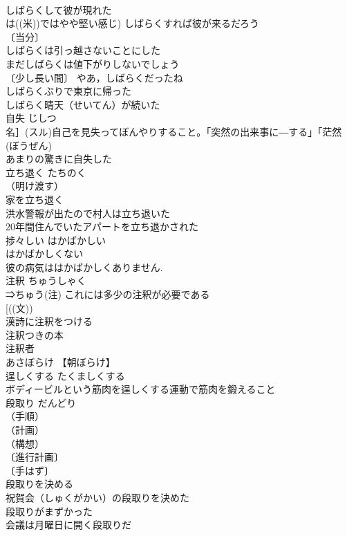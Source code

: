 \documentclass[8pt]{extreport}
\begin{document}
\begin{CJK}{UTF8}{min}
\\	しばらくして彼が現れた 
\\	は((米))ではやや堅い感じ) しばらくすれば彼が来るだろう 
\\	〔当分〕
\\	しばらくは引っ越さないことにした 
\\	まだしばらくは値下がりしないでしょう 
\\	〔少し長い間〕 やあ，しばらくだったね 
\\	しばらくぶりで東京に帰った 
\\	しばらく晴天（せいてん）が続いた 
\\	自失	じしつ	
\\	名］(スル)自己を見失ってぼんやりすること。「突然の出来事に―する」「茫然 (ぼうぜん) 
\\	あまりの驚きに自失した 
\\	立ち退く	たちのく	
\\	（明け渡す）
\\	家を立ち退く 
\\	洪水警報が出たので村人は立ち退いた 
\\	20年間住んでいたアパートを立ち退かされた 
\\	捗々しい	はかばかしい	
\\	はかばかしくない 
\\	彼の病気ははかばかしくありません. 
\\	注釈	ちゅうしゃく	
\\	⇒ちゅう(注) これには多少の注釈が必要である 
\\	[((文))
\\	漢詩に注釈をつける 
\\	注釈つきの本 
\\	注釈者 
\\	あさぼらけ	【朝ぼらけ】	
\\	逞しくする	たくましくする	
\\	ボディービルという筋肉を逞しくする運動で筋肉を鍛えること 
\\	段取り	だんどり	
\\	（手順）
\\	（計画）
\\	（構想）
\\	〔進行計画〕
\\	〔手はず〕
\\	段取りを決める 
\\	祝賀会（しゅくがかい）の段取りを決めた 
\\	段取りがまずかった 
\\	会議は月曜日に開く段取りだ 

\end{CJK}
\end{document}

